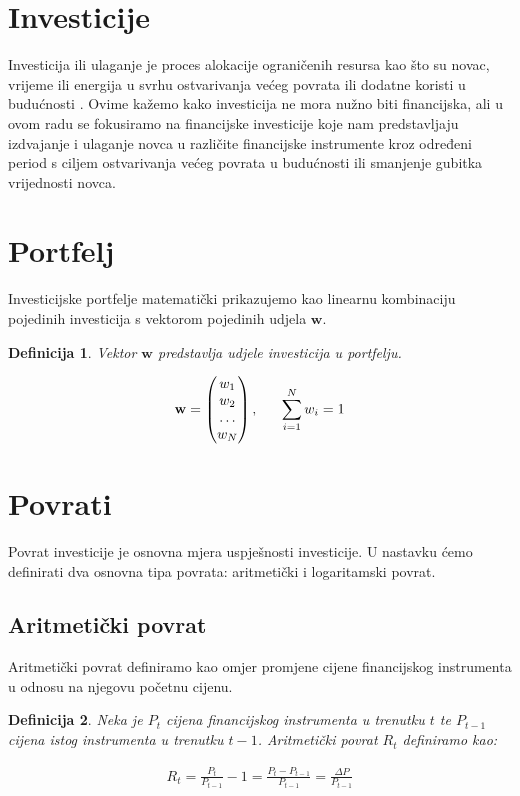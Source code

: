 \documentclass[zavrsnirad, upload]{fer}
\newtheorem{definition}{Definicija}
\begin{document}
\section{Investicije}
\label{sek:investicije}
Investicija ili ulaganje je proces alokacije ograničenih resursa
kao što su novac, vrijeme ili energija u svrhu ostvarivanja
većeg povrata ili dodatne koristi u budućnosti \cite{Investments}.
Ovime kažemo kako investicija ne mora nužno biti financijska,
ali u ovom radu se fokusiramo na financijske investicije koje nam
predstavljaju izdvajanje i ulaganje novca u različite financijske instrumente
kroz određeni period s ciljem ostvarivanja većeg povrata
u budućnosti ili smanjenje gubitka vrijednosti novca.

\section{Portfelj}
\label{sek:portfelj}
Investicijske portfelje matematički prikazujemo kao linearnu kombinaciju
pojedinih investicija s vektorom pojedinih udjela $\mathbf{w}$.
\begin{definition}
	Vektor $\mathbf{w}$ predstavlja udjele investicija u portfelju.
\end{definition}
\begin{align}
	\mathbf{w} = \begin{pmatrix} w_1 \\ w_2 \\ \dots \\ w_N \end{pmatrix},
	\indent \sum_{i = 1}^{N} w_i = 1
\end{align}

\section{Povrati}
\label{sek:povrati}
Povrat investicije je osnovna mjera uspješnosti investicije. U nastavku
ćemo definirati dva osnovna tipa povrata: aritmetički i logaritamski povrat.

\subsection{Aritmetički povrat}
Aritmetički povrat definiramo kao omjer promjene cijene financijskog instrumenta
u odnosu na njegovu početnu cijenu.
\begin{definition}
	Neka je $P_t$ cijena financijskog instrumenta u trenutku $t$ te
    $P_{t-1}$ cijena istog instrumenta u trenutku $t-1$. Aritmetički povrat
    $R_t$ definiramo kao:
\end{definition}
\begin{align}R_t = \frac{P_t}{P_{t-1}} - 1 =
    \frac{P_t - P_{t-1}}{P_{t-1}} =
\frac{\Delta P}{P_{t-1}}
\end{align}
\end{document}
